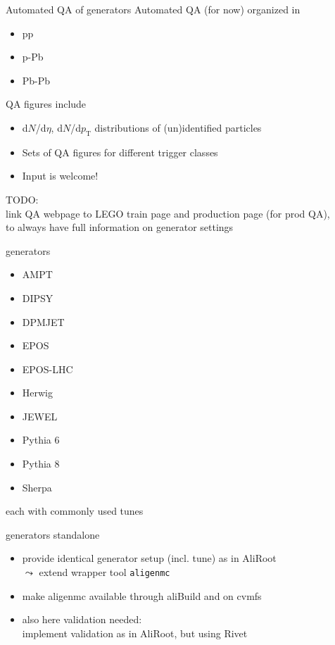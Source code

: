 \documentclass[table]{beamer}
\begin{document}
\begin{frame}{Automated QA of generators}
    Automated QA (for now) organized in
\begin{itemize}
    \item pp
    \item p-Pb
    \item Pb-Pb
\end{itemize}
\vspace{.5cm}

QA figures include
\begin{itemize}
    \item d$N$/d$\eta$, d$N$/d$p_{\text{T}}$ distributions of (un)identified particles
    \item Sets of QA figures for different trigger classes 
    \item Input is welcome!
\end{itemize}
\vspace{.5cm}

TODO:\\
link QA webpage to LEGO train page and production page (for prod QA),\\
to always have full information on generator settings
\end{frame}


\begin{frame}{generators}
  \begin{itemize}
    \setlength{\itemsep}{.25cm}
  \item AMPT
  \item DIPSY
  \item DPMJET
  \item EPOS
  \item EPOS-LHC
  \item Herwig
  \item JEWEL
  \item Pythia 6
  \item Pythia 8
  \item Sherpa
  \end{itemize}
  each with commonly used tunes
\end{frame}

\begin{frame}{generators standalone}
  \begin{itemize}
    \setlength{\itemsep}{.25cm}
  \item provide identical generator setup (incl. tune) as in AliRoot\\
    $\leadsto$ extend wrapper tool \texttt{aligenmc}
  \item make aligenmc available through aliBuild and on cvmfs
  \item also here validation needed:\\
    implement validation as in AliRoot, but using Rivet
  \end{itemize}
\end{frame}
\end{document}
